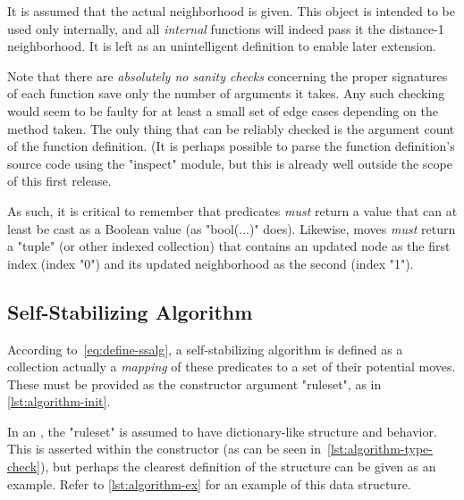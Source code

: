 \begin{warning}
  It is assumed that the actual neighborhood is given.
  This object is intended to be used only internally,
    and all \emph{internal} functions will indeed pass it the distance-1 neighborhood.
  It is left as an unintelligent definition to enable later extension.

  Note that there are \emph{absolutely no sanity checks} concerning
    the proper signatures of each function save only the number of arguments it takes.
  Any such checking would seem to be faulty for at least a small set of edge cases
    depending on the method taken.
  The only thing that can be reliably checked is the argument count of the function definition.
  (It is perhaps possible to parse the function definition's source code
    using the "inspect" module, but this is already well outside the scope of this first release.

  As such, it is critical to remember that predicates \emph{must} return a value
    that can at least be cast as a Boolean value (as "bool(...)" does).
  Likewise, moves \emph{must} return a "tuple" (or other indexed collection)
    that contains an updated node as the first index (index "0") and
    its updated neighborhood as the second (index "1").
\end{warning}

\subsection{Self-Stabilizing Algorithm}
\label{sec:logic-repr:self-stab-algor}

According to~\eqref{eq:define-ssalg},
  a self-stabilizing algorithm is defined as a collection
  \Dash actually a \emph{mapping} \Dash 
  of these predicates to a set of their potential moves.
These must be provided as the constructor argument "ruleset",
  as in \autoref{lst:algorithm-init}.

In an , the "ruleset" is assumed to have
  dictionary-like structure and behavior.
This is asserted within the constructor (as can be seen in~\autoref{lst:algorithm-type-check}),
  but perhaps the clearest definition of the structure can be given as an example.
Refer to \autoref{lst:algorithm-ex} for an example of this data structure.


